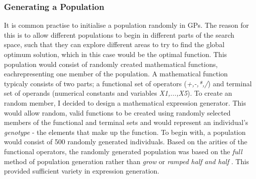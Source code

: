 \documentclass[11pt]{article}
\begin{document}
\subsubsection{Generating a Population}
It is common practise to initialise a population randomly in GPs. The reason for this is to allow different populations to begin in different parts of the search space, such that they can explore different areas to try to find the global optimum solution, which in this case would be the optimal function.  This population would consist of randomly created mathematical functions, eachrepresenting one member of the population. A mathematical function typicaly consists of two parts; a functional set of operators (\textit{+,-,*,/}) and terminal set of operands (numerical constants and variables \textit{X1,...,X5}). To create an random member, I decided to design a mathematical expression generator. This would allow random, valid functions to be created using randomly selected members of the functional and terminal sets and would represent an individual's \textit{genotype} - the elements that make up the function. To begin with, a population would consist of 500 randomly generated individuals. Based on the arities of the functional operators, the randomly generated population was based on the \textit{full} method of population generation \cite{?} rather than \textit{grow} or \textit{ramped half and half} \cite{?}. This provided sufficient variety in expression generation.
\end{document}
